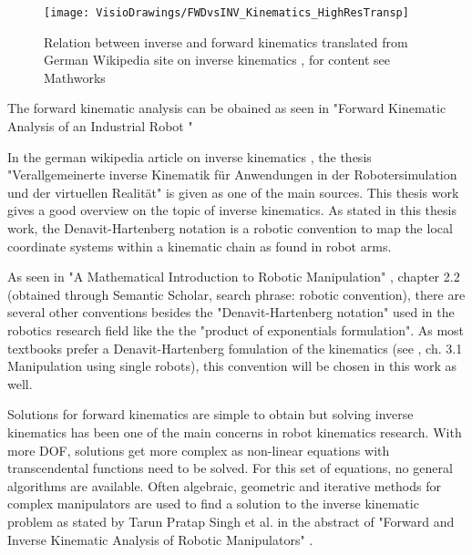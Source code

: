\begin{figure}[H]
	\texttt{[image: VisioDrawings/FWDvsINV\_Kinematics\_HighResTransp]}
	\caption{Relation between inverse and forward kinematics translated from German Wikipedia site on inverse kinematics \cite{MathWorksInverseKinematics}, for content see Mathworks \cite{forwardVsInverseKinematics}}
	\label{fig:FwVsInvKin}
\end{figure}

The forward kinematic analysis can be obained as seen in "Forward Kinematic Analysis of an Industrial Robot " \cite{ConstantinForwardKA}

In the german wikipedia article on inverse kinematics \cite{inverseKinematikWiki}, the thesis "Verallgemeinerte inverse Kinematik für Anwendungen in der Robotersimulation und der virtuellen Realität" \cite{allgInvKin} is given as one of the main sources. 
This thesis work gives a good overview on the topic of inverse kinematics. 
As stated in this thesis work, the Denavit-Hartenberg notation is a robotic convention to map the local coordinate systems within a kinematic chain as found in robot arms.

As seen in "A Mathematical Introduction to Robotic Manipulation" \cite{MathIntroRobManip}, chapter 2.2 (obtained through Semantic Scholar, search phrase: robotic convention), there are several other conventions besides the "Denavit-Hartenberg notation" used in the robotics research field like the the "product of exponentials formulation".
As most textbooks prefer a Denavit-Hartenberg fomulation of the kinematics (see \cite{MathIntroRobManip}, ch. 3.1 Manipulation using single robots), this convention will be chosen in this work as well.

Solutions for forward  kinematics are simple to obtain but solving inverse kinematics  has  been  one of  the  main  concerns  in  robot kinematics research. 
With more \ac{DOF}, solutions get more complex as non-linear equations with transcendental functions need to be solved. 
For this set of equations, no general algorithms are available.
Often algebraic, geometric and iterative methods for complex manipulators are used to find a solution to the inverse kinematic problem as stated by Tarun Pratap Singh et al. in the abstract of "Forward and Inverse Kinematic Analysis of Robotic Manipulators" \cite{FwdInvAnalysRobManip}.

